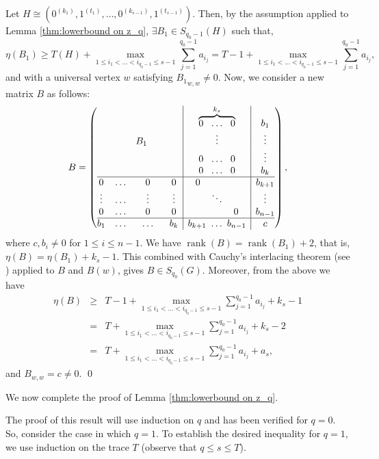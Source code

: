 \documentclass[3p,times,12pt]{article}
\newenvironment{pf}{\medskip {Proof:  \hspace*{-.4cm}}
    \enspace}{\hfill \qed \newline \medskip}
\DeclareMathOperator{\rank}{rank}
\begin{document}
 \begin{pf}
 Let $H\cong (0^{(k_1)}, 1^{(t_1)}, \ldots,0^{(k_{s-1})}, 1^{(t_{s-1})})$. Then, by the assumption applied to Lemma \ref{thm:lowerbound on z_q},  $\exists B_1\in S_{q_0 -1}(H)$ such that, $$\eta(B_1)\ge T(H)+\max_{1 \le i_1<\ldots<i_{q_{0}-1} \le s-1} \sum_{j=1}^{q_{0}-1} a_{i_j}=T-1+\max_{1 \le i_1<\ldots<i_{q_{0}-1} \le s-1} \sum_{j=1}^{q_{0}-1} a_{i_j},$$ and with a universal vertex $w$ satisfying ${B_1}_{w,w}\neq 0$. Now, we consider a new matrix $B$ as follows:
 $$B= \left(\begin{array}{@{}cccc|c|c@{}}
     &  &   &   &\overbrace{0 ~~\ldots ~~ 0}^{k_s} & b_1 \\
     &  & B_1~~~~  &   &\vdots &\vdots  \\
     &  &   &   & 0~~\ldots ~~ 0 &\vdots  \\
     &  &   &   & 0 ~~\ldots ~~0 & b_k \\\hline
    0 & \ldots & 0  & 0& 0 ~~~~~~~~~~~~ & b_{k+1} \\
    \vdots & \ldots & \vdots  & \vdots & \ddots & \vdots \\
   0 & \ldots & 0  & 0& ~~~~~~~~~~~~0 & b_{n-1} \\\hline
    b_1 & \ldots & \ldots  & b_k & b_{k+1}~\ldots~b_{n-1}  & c
  \end{array}\right),$$ where $c, b_i\neq 0$ for $1\le i \le n-1$. We have  
  $\rank(B)=\rank(B_1)+2$, that is, $\eta(B)=\eta(B_1)+k_s-1$. This combined with Cauchy's interlacing theorem (see \cite{HJ1}) applied to $B$ and $B(w)$, gives $B\in S_{q_0}(G)$. Moreover, from the above we have 
 \begin{eqnarray*}
 \eta(B) & \ge & T-1+\max_{1 \le i_1<\ldots<i_{q_{0}-1} \le s-1} \sum_{j=1}^{q_{0}-1} a_{i_j}+k_s-1 \\
 &= & T+\max_{1 \le i_1<\ldots<i_{q_{0}-1} \le s-1} \sum_{j=1}^{q_{0}-1} a_{i_j}+k_s-2 \\
 &=& 
 T+\max_{1 \le i_1<\ldots<i_{q_{0}-1} \le s-1} \sum_{j=1}^{q_{0}-1} a_{i_j}+a_s, \end{eqnarray*}
  and $B_{w,w}=c\neq 0$.  \end{pf}
 

We now complete the proof of Lemma \ref{thm:lowerbound on z_q}.

 The proof of this result will use induction on $q$ and has been verified for $q=0$. So, consider the case in which $q=1$. To establish the desired inequality for $q=1$, we use induction on the trace $T$ (observe that $q \leq s \leq T$). 
\vspace{3mm}
\end{document}
